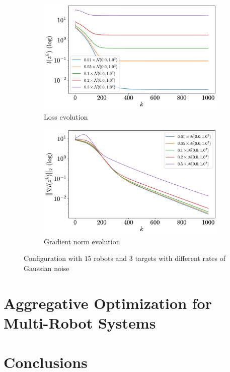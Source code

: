 \documentclass[a4paper,11pt,oneside]{book}
\begin{document}
\begin{figure}[H]
      \centering
      \begin{subfigure}[t]{0.49\textwidth}
            \centering
            \includegraphics[width=\linewidth]{./figs/tracking/loss_rates_15_3_2_1000.pdf} 
            \caption{Loss evolution}
      \end{subfigure}
      \hfill
      \begin{subfigure}[t]{0.49\textwidth}
            \centering
            \includegraphics[width=\linewidth]{./figs/tracking/gradient_rates_15_3_2_1000.pdf} 
            \caption{Gradient norm evolution}
      \end{subfigure}
      \caption{Configuration with $15$ robots and $3$ targets with different rates of Gaussian noise}
      \label{fig:tracking_rates_15_3}
\end{figure}


\chapter{Aggregative Optimization for Multi-Robot Systems}





\chapter*{Conclusions}



{}

\end{document}
